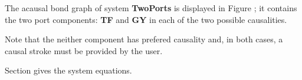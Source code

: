 

   The acausal bond graph of system \textbf{TwoPorts} is
   displayed in Figure ; it contains the two
   port components: \textbf{TF} and \textbf{GY} in each of
   the two possible causalities.
   
   Note that the neither component has prefered causality and, in both
   cases, a causal stroke must be provided by the user. 
   
   Section  gives the system equations.